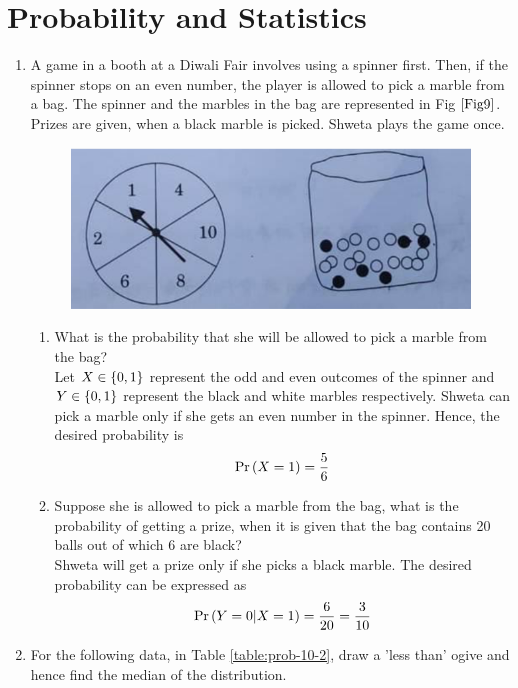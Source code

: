 \documentclass[journal,12pt,twocolumn]{IEEEtran}
\begin{document}
\section{Probability and Statistics}
\begin{enumerate}
    \item A game in a booth at a Diwali Fair involves using a spinner first. Then, if the spinner stops on an even number, the player is allowed to pick a marble from a bag. The spinner and the marbles in the bag are represented in Fig $\ref{Fig9}$.\\
    Prizes are given, when a black marble is picked. Shweta plays the game once.
    \begin{figure}[h!]
        \centering
        \includegraphics[width=0.5\columnwidth]{Fig9.png}
	    \caption{}
	    \label{Fig9}
    \end{figure} 
    \begin{enumerate}
        \item What is the probability that she will be allowed to pick a marble from the bag?\\
		\solution Let $X\in \left\{0,1\right\}$ represent the odd and even outcomes of the spinner and $Y \in \left\{0,1\right\}$ represent the black and white marbles respectively.  Shweta can pick a marble only if she gets an even number in the spinner.  Hence, the desired probability is 
		    \begin{align}
			    \Pr\left(X = 1\right) = \frac{5}{6}
		    \end{align}
        \item Suppose she is allowed to pick a marble from the bag, what is the probability of getting a prize, when it is given that the bag contains 20 balls out of which 6 are black?\\
		\solution Shweta will get a prize only if she picks a black marble.  The desired probability can be expressed as 
		    \begin{align}
			    \Pr\left(Y = 0 | X = 1\right) = \frac{6}{20} = \frac{3}{10}
		    \end{align}
    \end{enumerate}
        \item For the following data, in Table 
			\ref{table:prob-10-2}, draw a 'less than' ogive and hence find the median of the distribution.
		\begin{table}[!hb]
			\resizebox{\columnwidth}{!}{

}
\end{table}
\end{enumerate}
\end{document}
